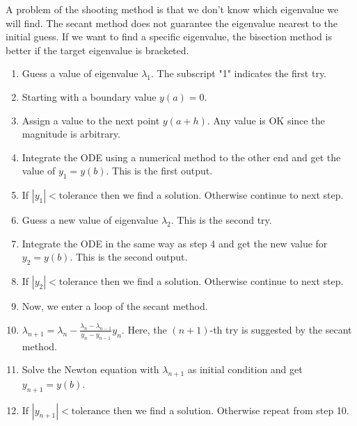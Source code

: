 A problem of the shooting method is that we don't know which eigenvalue we will find.  The secant method does not guarantee the eigenvalue nearest to the initial guess. If we want to find a specific eigenvalue, the bisection method is better if the target eigenvalue is bracketed. 

\bigskip 
\begin{myalgobox}
   \label{algo:eigen_shooting_secant}
   \begin{minipage}{5.5in}
      \begin{enumerate}
         \item Guess a value of eigenvalue $\lambda_1$.  The subscript "1" indicates the first try.
         \item Starting with a boundary value $y(a)=0$.
         \item Assign a value to the next point $y(a+h)$.  Any value is OK since the magnitude is arbitrary.
         \item Integrate the ODE using a numerical method to the other end and get the value of $y_1=y(b)$.  This is the first output.
         \item If $|y_1| < \text{tolerance}$ then we find a solution. Otherwise continue to next step.
         \item Guess a new value of eigenvalue $\lambda_2$.  This is the second try.
         \item Integrate the ODE in the same way as step 4 and get the new value for $y_2=y(b)$.  This is the second output.
         \item If $|y_2| < \text{tolerance}$ then we find a solution. Otherwise continue to next step.
         \item Now, we enter a loop of the secant method.
         \item $\lambda_{n+1} = \lambda_{n} - \displaystyle\frac{\lambda_{n} - \lambda_{n-1}}{y_{n}-y_{n-1}} y_{n}$.  Here, the $(n+1)$-th try is suggested by the secant method.
         \item Solve the Newton equation with $\lambda_{n+1}$ as initial condition and get $y_{n+1} = y(b)$.
         \item If $|y_{n+1}| < \text{tolerance}$ then we find a solution.  Otherwise repeat from step 10.
      \end{enumerate}
   \end{minipage}
\end{myalgobox}

